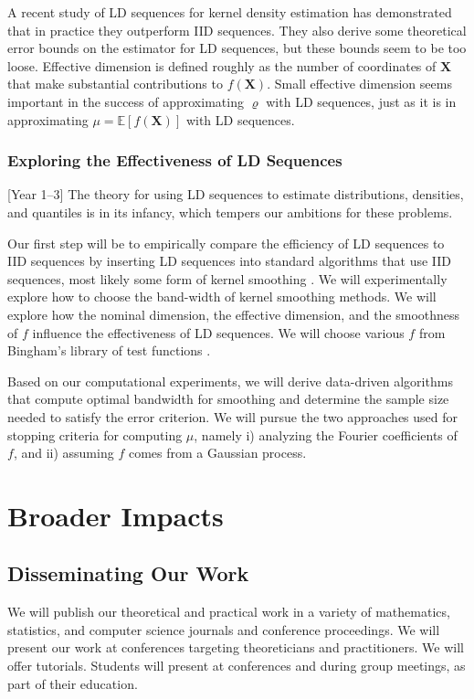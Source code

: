 \documentclass[11pt]{NSFamsart}
\newcommand{\cmtS}[1]{{\color{blue}{(Simon: #1)}}}
\newcommand{\bbE}{\mathbb{E}}
\newcommand{\bX}{{\boldsymbol{X}}}
\begin{document}
A recent study of LD sequences for kernel density estimation \cite{AbdEtal21a} has demonstrated that in practice they outperform IID sequences.  They also derive some theoretical error bounds on the estimator for LD sequences, but these bounds seem to be too loose.  Effective dimension is defined roughly as the number of coordinates of $\bX$ that make substantial contributions to $f(\bX)$.  Small effective dimension seems important in the success of approximating  $\varrho$ with LD sequences, just as it is in approximating  $\mu = \bbE[f(\bX)]$ with LD sequences.

\subsubsection{Exploring the Effectiveness of LD Sequences}[Year 1--3] The theory for using LD sequences to estimate distributions, densities, and quantiles is in its infancy, which tempers our ambitions for these problems.  

Our first step will be to empirically compare the efficiency of LD sequences to IID sequences by inserting LD sequences into standard algorithms that use IID sequences, most likely some form of kernel smoothing \cite{WanJon95a}.  We will experimentally explore how to choose the band-width of kernel smoothing methods.  We will explore how the nominal dimension, the effective dimension, and the smoothness of $f$ influence the effectiveness of LD sequences.  We will choose various $f$ from Bingham's library of test functions \cite{VirLib17a}.

Based on  our computational experiments, we will derive data-driven algorithms that compute optimal bandwidth for smoothing and determine the sample size needed to satisfy the error criterion.  We will pursue the two approaches used for stopping criteria for computing $\mu$, namely i) analyzing the Fourier coefficients of $f$, and ii) assuming $f$ comes from a Gaussian process.



\section{Broader Impacts}


\subsection{Disseminating Our Work} We will publish our theoretical and practical work in a variety of mathematics, statistics, and computer science journals and conference proceedings. We will present our work at conferences targeting theoreticians and practitioners.  We will offer tutorials.  Students will present at conferences and during group meetings, as part of their education. \cmtS{expand and discuss cross-disciplinary dissemination to the broad scientific community? some sample writing below from another proposal}
\end{document}
